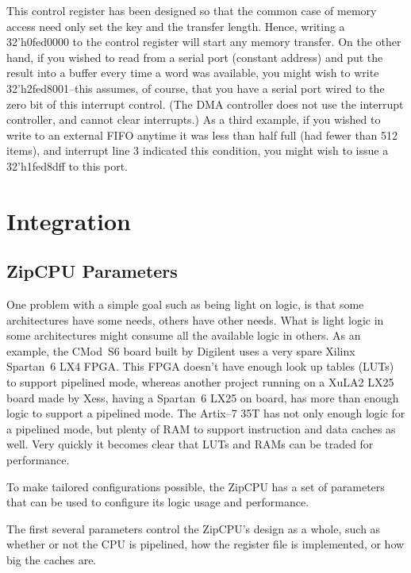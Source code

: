 \documentclass{gqtekspec}
\begin{document}
This control register has been designed so that the common case of memory
access need only set the key and the transfer length.  Hence, writing a
\hbox{32'h0fed0000} to the control register will start any memory transfer.  
On the other hand, if you wished to read from a serial port (constant address)
and put the result into a buffer every time a word was available, you 
might wish to write \hbox{32'h2fed8001}--this assumes, of course, that you
have a serial port wired to the zero bit of this interrupt control.  (The
DMA controller does not use the interrupt controller, and cannot clear
interrupts.)  As a third example, if you wished to write to an external
FIFO anytime it was less than half full (had fewer than 512 items), and
interrupt line 3 indicated this condition, you might wish to issue a
\hbox{32'h1fed8dff} to this port.
\chapter{Integration}\label{chap:integration}
\section{ZipCPU Parameters}\label{ssec:build-options}
One problem with a simple goal such as being light on logic, is that some
architectures have some needs, others have other needs.  What is light logic
in some architectures might consume all the available logic in others.
As an example, the CMod~S6 board built by Digilent uses a very spare Xilinx
Spartan~6 LX4 FPGA.  This FPGA doesn't have enough look up tables (LUTs) to
support pipelined mode, whereas another project running on a XuLA2 LX25 board
made by Xess, having a Spartan~6 LX25 on board, has more than enough logic
to support a pipelined mode.  The Artix--7 35T has not only enough logic for
a pipelined mode, but plenty of RAM to support instruction and data caches
as well.  Very quickly it becomes clear that LUTs and RAMs can be traded for
performance.

To make tailored configurations possible, the ZipCPU has a set of parameters
that can be used to configure its logic usage and performance.

The first several parameters control the ZipCPU's design as a whole, such
as whether or not the CPU is pipelined, how the register file is implemented,
or how big the caches are.
\end{document}
